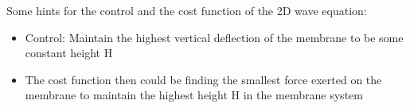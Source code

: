 Some hints for the control and the cost function of the 2D wave equation:
\begin{itemize}
	\item Control: Maintain the highest vertical deflection of the membrane to be some constant height H   
  \item The cost function then could be finding the smallest force exerted on the membrane to maintain the highest height H in the membrane system  
\end{itemize}